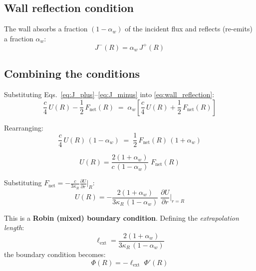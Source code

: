 \documentclass[12pt]{article}
\newcommand{\lext}{\ell_{\mathrm{ext}}}
\newcommand{\alphaW}{\alpha_w}
\newcommand{\pder}[2]{\frac{\partial #1}{\partial #2}}
\begin{document}
\subsection{Wall reflection condition}

The wall absorbs a fraction $(1 - \alphaW)$ of the incident flux and reflects
(re-emits) a fraction $\alphaW$:
\begin{equation}
    J^-(R) = \alphaW\,J^+(R)
    \label{eq:wall_reflection}
\end{equation}

\subsection{Combining the conditions}

Substituting Eqs.~\eqref{eq:J_plus}--\eqref{eq:J_minus} into
\eqref{eq:wall_reflection}:
\begin{equation}
    \frac{c}{4}\,U(R) - \frac{1}{2}\,F_{\mathrm{net}}(R)
    \;=\; \alphaW\left[\frac{c}{4}\,U(R) + \frac{1}{2}\,F_{\mathrm{net}}(R)\right]
    \label{eq:combined_BC}
\end{equation}

Rearranging:
\begin{equation}
    \frac{c}{4}\,U(R)\,(1 - \alphaW)
    \;=\; \frac{1}{2}\,F_{\mathrm{net}}(R)\,(1 + \alphaW)
\end{equation}

\begin{equation}
    \boxed{U(R) = \frac{2(1 + \alphaW)}{c\,(1 - \alphaW)}\;F_{\mathrm{net}}(R)}
    \label{eq:robin_energy}
\end{equation}

Substituting $F_{\mathrm{net}} = -\frac{c}{3\kappa_R}\frac{\partial U}{\partial r}\big|_R$:
\begin{equation}
    U(R) = -\frac{2(1 + \alphaW)}{3\kappa_R\,(1 - \alphaW)}\;\pder{U}{r}\bigg|_{r=R}
    \label{eq:robin_U}
\end{equation}

This is a \textbf{Robin (mixed) boundary condition}. Defining the
\emph{extrapolation length}:
\begin{equation}
    \boxed{\lext = \frac{2(1 + \alphaW)}{3\kappa_R\,(1 - \alphaW)}}
    \label{eq:ell_ext}
\end{equation}
the boundary condition becomes:
\begin{equation}
    \Phi(R) = -\lext\;\Phi'(R)
    \label{eq:robin_phi}
\end{equation}
\end{document}
